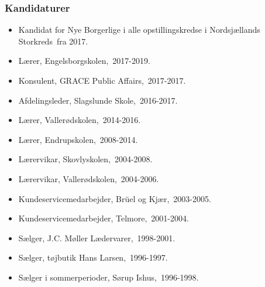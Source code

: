 \documentclass[11pt, a4paper]{awesome-cv}
\begin{document}
\begin{cvletter}
\subsubsection*{Kandidaturer}
\begin{itemize}
\item Kandidat for Nye Borgerlige i alle opstillingskredse i Nordsjællands Storkreds fra 2017.
\end{itemize}
\begin{itemize}
\item Lærer, Engelsborgskolen, 2017-2019.
\item Konsulent, GRACE Public Affairs, 2017-2017.
\item Afdelingsleder, Slagslunde Skole, 2016-2017.
\item Lærer, Vallerødskolen, 2014-2016.
\item Lærer, Endrupskolen, 2008-2014.
\item Lærervikar, Skovlyskolen, 2004-2008.
\item Lærervikar, Vallerødskolen, 2004-2006.
\item Kundeservicemedarbejder, Brüel og Kjær, 2003-2005.
\item Kundeservicemedarbejder, Telmore, 2001-2004.
\item Sælger, J.C. Møller Lædervarer, 1998-2001.
\item Sælger, tøjbutik Hans Larsen, 1996-1997.
\item Sælger i sommerperioder, Sørup Ishus, 1996-1998.
\end{itemize}
\end{cvletter}
\end{document}
